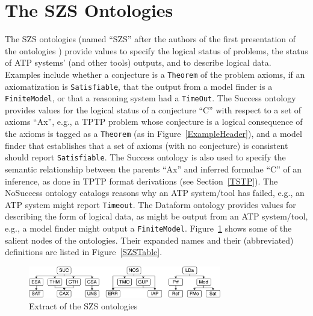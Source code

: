 \documentclass{easychair}
\begin{document}
\section{The SZS Ontologies}
\label{SZS}

The SZS ontologies \cite{Sut08-KEAPPA} (named ``SZS'' after the authors of the first presentation 
of the ontologies \cite{SZS03}) provide values to specify the logical status of problems, 
the status of ATP systems' (and other tools) outputs, and to describe logical data.
Examples include whether a conjecture is a {\tt Theorem} of the problem axioms, if an
axiomatization is {\tt Satisfiable}, that the output from a model finder is a {\tt FiniteModel},
or that a reasoning system had a {\tt TimeOut}.
The Success ontology provides values for the logical status of a conjecture ``C'' with respect to a 
set of axioms ``Ax'', e.g., a TPTP problem whose conjecture is a logical consequence of the axioms 
is tagged as a {\tt Theorem} (as in Figure~\ref{ExampleHeader}), and a model finder that 
establishes that a set of axioms (with no conjecture) is consistent should report 
{\tt Satisfiable}.
The Success ontology is also used to specify the semantic relationship between the parents ``Ax''
and inferred formulae ``C'' of an inference, as done in TPTP format derivations (see 
Section~\ref{TSTP}).
The NoSuccess ontology catalogs reasons why an ATP system/tool has failed, e.g., an ATP system 
might report {\tt Timeout}.
The Dataform ontology provides values for describing the form of logical data, as might be output 
from an ATP system/tool, e.g., a model finder might output a {\tt FiniteModel}.
Figure~\ref{SZSExtract} shows some of the salient nodes of the ontologies.
Their expanded names and their (abbreviated) definitions are listed in Figure~\ref{SZSTable}.

\begin{figure}[htb]
\centering
\includegraphics[width=0.75\textwidth]{SZSExtract.pdf}
\caption{Extract of the SZS ontologies}
\label{SZSExtract}
\end{figure} 
\end{document}
